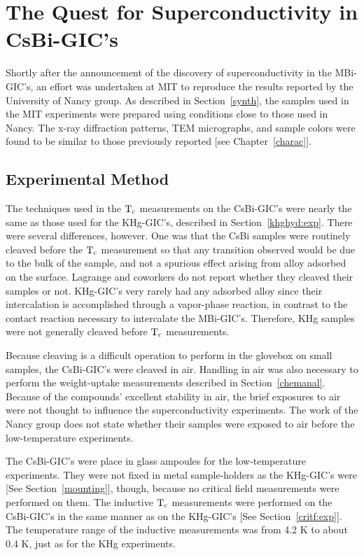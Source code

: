 \section{The Quest for Superconductivity in CsBi-GIC's}
\label{csbitc}

	Shortly  after     the   announcement    of   the  discovery     of
superconductivity  in the   MBi-GIC's, an effort  was  undertaken at MIT to
reproduce  the results reported   by  the   University of Nancy  group.  As
described     in Section~\ref{synth}, the  samples   used  in  the  MIT
experiments were prepared using conditions  close to those  used in  Nancy.
The x-ray diffraction patterns,   TEM micrographs, and sample colors   were
found  to       be   similar  to     those   previously    reported    [see
Chapter~\ref{charac}].

\subsection{Experimental Method}
\label{csbi:exp}

	The techniques used in the $\rm T_c$ measurements on the CsBi-GIC's
were nearly the   same as those  used  for the   KHg-GIC's,  described   in
Section~\ref{khghyd:exp}.  There  were several differences,   however.  One
was that  the  CsBi  samples were  routinely  cleaved before the  $\rm T_c$
measurement so that any transition observed would be due to the bulk of the
sample,   and  not  a spurious effect  arising from  alloy  adsorbed on the
surface.   Lagrange and coworkers do not  report whether they cleaved their
samples  or not.  KHg-GIC's very rarely  had any adsorbed alloy since their
intercalation  is accomplished through a  vapor-phase reaction, in contrast
to the contact reaction necessary to intercalate the MBi-GIC's.  Therefore,
KHg samples were not generally cleaved before $\rm T_c$ measurements.

	Because   cleaving is  a  difficult   operation to perform   in the
glovebox on small samples, the CsBi-GIC's were cleaved in air.  Handling in
air was also necessary to  perform the weight-uptake measurements described
in  Section~\ref{chemanal}.   Because  of     the  compounds'  excellent
stability   in air,\cite{lagrange87} the   brief exposures to  air were not
thought to  influence the superconductivity  experiments.  The  work of the
Nancy group does not state whether their samples were exposed to air before
the low-temperature experiments.

	The CsBi-GIC's were place in glass ampoules for the low-temperature
experiments. They were not fixed in metal sample-holders as the KHg-GIC's
were [See Section~\ref{mounting}], though, because no critical field
measurements were performed on them.  The inductive $\rm T_c $ measurements
were performed on the CsBi-GIC's in the same manner as on the KHg-GIC's
[See Section~\ref{critf:exp}].  The temperature range of the inductive
measurements was from 4.2 K to about 0.4 K, just as for the  KHg
experiments.

